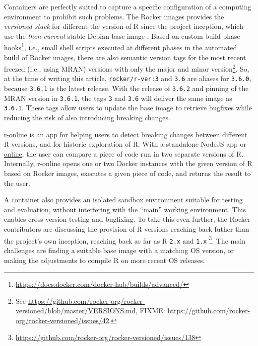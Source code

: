 Containers are perfectly suited to capture a specific configuration of a
computing environment to prohibit such problems. The Rocker images
provides the \emph{versioned stack} for different the version of R since
the project inception, which use the \emph{then-current} stable Debian
base image \citep[cf.][]{RJ-2017-065}. Based on custom build phase
hooks\footnote{\href{https://docs.docker.com/docker-hub/builds/advanced/}{https://docs.docker.com/docker-hub/builds/advanced/}},
i.e., small shell scripts executed at different phases in the automated
build of Rocker images, there are also semantic version tags for the
most recent freezed (i.e., using MRAN) versions with only the major and
minor
version\footnote{See \href{https://github.com/rocker-org/rocker-versioned/blob/master/VERSIONS.md}{https://github.com/rocker-org/rocker-versioned/blob/master/VERSIONS.md}, FIXME: \href{https://github.com/rocker-org/rocker-versioned/issues/42}{https://github.com/rocker-org/rocker-versioned/issues/42}.}.
So, at the time of writing this article, \texttt{rocker/r-ver:3} and
\texttt{3.6} are aliases for \texttt{3.6.0}, because \texttt{3.6.1} is
the latest release. With the release of \texttt{3.6.2} and pinning of
the MRAN version in \texttt{3.6.1}, the tags \texttt{3} and \texttt{3.6}
will deliver the same image as \texttt{3.6.1}. These tags allow users to
update the base image to retrieve bugfixes while reducing the risk of
also introducing breaking changes.

\href{https://github.com/ColinFay/ronline}{r-online} is an app for
helping users to detect breaking changes between different R versions,
and for historic exploration of R. With a standalone NodeJS app or
\href{https://srv.colinfay.me/r-online}{online}, the user can compare a
piece of code run in two separate versions of R. Internally, r-online
opens one or two Docker instances with the given version of R based on
Rocker images, executes a given piece of code, and returns the result to
the user.

A container also provides an isolated sandbox environment suitable for
testing and evaluation, without interfering with the ``main'' working
environment. This enables cross version testing and bugfixing. To take
this even further, the Rocker contributors are discussing the provision
of R versions reaching back futher than the project's own inception,
reaching back as far as R \texttt{2.x} and \texttt{1.x}
\footnote{\href{https://github.com/rocker-org/rocker-versioned/issues/138}{https://github.com/rocker-org/rocker-versioned/issues/138}}.
The main challenges are finding a suitable base image with a matching OS
version, or making the adjustments to compile R on more recent OS
releases.

